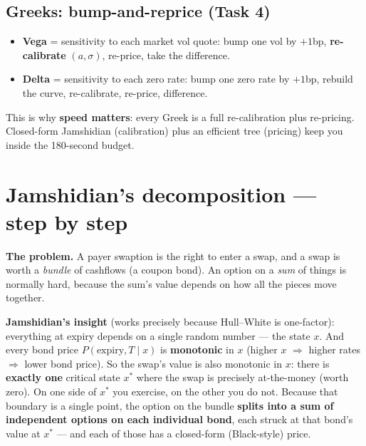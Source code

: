 \documentclass[11pt]{article}
\begin{document}
\subsection{Greeks: bump-and-reprice (Task 4)}
\begin{itemize}[leftmargin=1.4em]
  \item \textbf{Vega} = sensitivity to each market vol quote: bump one vol by $+1$bp,
        \textbf{re-calibrate} $(a,\sigma)$, re-price, take the difference.
  \item \textbf{Delta} = sensitivity to each zero rate: bump one zero rate by $+1$bp,
        rebuild the curve, re-calibrate, re-price, difference.
\end{itemize}
This is why \textbf{speed matters}: every Greek is a full re-calibration plus
re-pricing. Closed-form Jamshidian (calibration) plus an efficient tree (pricing) keep
you inside the 180-second budget.

\section{Jamshidian's decomposition --- step by step}

\textbf{The problem.} A payer swaption is the right to enter a swap, and a swap is
worth a \emph{bundle} of cashflows (a coupon bond). An option on a \emph{sum} of
things is normally hard, because the sum's value depends on how all the pieces move
together.

\textbf{Jamshidian's insight} (works precisely because Hull--White is one-factor):
everything at expiry depends on a single random number --- the state $x$. And every
bond price $P(\text{expiry},T\mid x)$ is \textbf{monotonic} in $x$ (higher $x$
$\Rightarrow$ higher rates $\Rightarrow$ lower bond price). So the swap's value is also
monotonic in $x$: there is \textbf{exactly one} critical state $x^\ast$ where the swap is
precisely at-the-money (worth zero). On one side of $x^\ast$ you exercise, on the other
you do not. Because that boundary is a single point, the option on the bundle
\textbf{splits into a sum of independent options on each individual bond}, each struck at
that bond's value at $x^\ast$ --- and each of those has a closed-form (Black-style) price.
\end{document}
